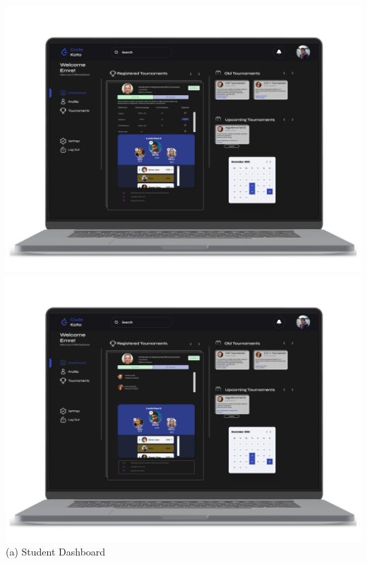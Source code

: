 \begin{center}
    \includegraphics[scale=0.13]{Images/ui-ux/student_dashboard/student_dashboard_1.png}
    \includegraphics[scale=0.13]{Images/ui-ux/student_dashboard/student_dashboard_2.png}
            (a) Student Dashboard
\end{center}
